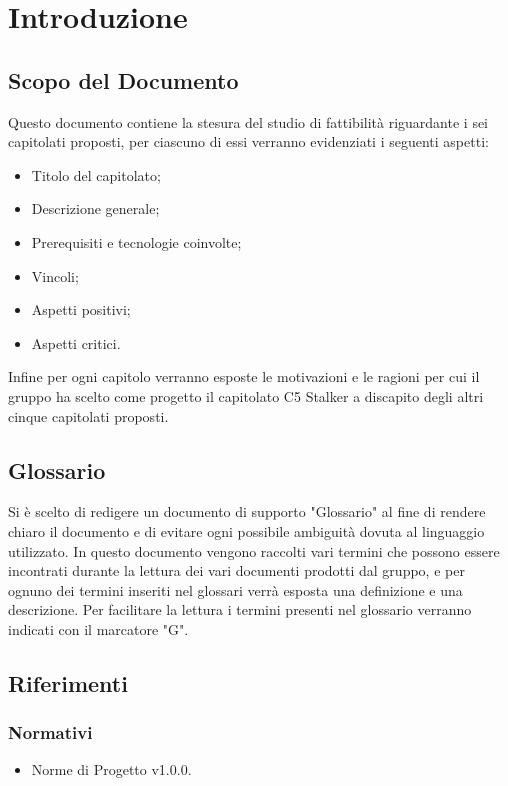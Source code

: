\section{Introduzione}
\subsection{Scopo del Documento}
Questo documento contiene la stesura del studio di fattibilità riguardante i sei capitolati proposti, per ciascuno di essi verranno evidenziati i seguenti aspetti:
\begin{itemize}
\item Titolo del capitolato;
\item Descrizione generale;
\item Prerequisiti e tecnologie coinvolte;
\item Vincoli;
\item Aspetti positivi;
\item Aspetti critici.
\end{itemize}
Infine per ogni capitolo verranno esposte le motivazioni e le ragioni per cui il gruppo ha scelto come progetto il capitolato C5 Stalker a discapito degli altri cinque capitolati proposti.

\subsection{Glossario}
Si è scelto di redigere un documento di supporto "Glossario" al fine di rendere chiaro il documento e di evitare ogni possibile ambiguità dovuta al linguaggio utilizzato. In questo documento vengono raccolti vari termini che possono essere incontrati durante la lettura dei vari documenti prodotti dal gruppo, e per ognuno dei termini inseriti nel glossari  verrà esposta una definizione e una descrizione. Per facilitare la lettura i termini presenti nel glossario verranno indicati con il marcatore "G".
	
\subsection{Riferimenti}

\subsubsection{Normativi}
\begin{itemize}
\item Norme di Progetto v1.0.0.
\end{itemize}

